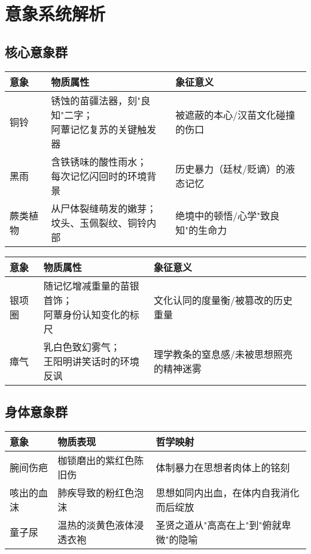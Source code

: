 \documentclass{article}
\begin{document}
	\section{意象系统解析}
	
	\subsection{核心意象群}
	
	\begin{table}[H]
		\centering
		\begin{tabular}{lll}
			\hline
			意象 & 物质属性 & 象征意义 \\ \hline
			铜铃 & \makecell[l]{锈蚀的苗疆法器，刻"良知"二字；\\阿蕈记忆复苏的关键触发器} & 被遮蔽的本心/汉苗文化碰撞的伤口   \\ 
			黑雨 & \makecell[l]{含铁锈味的酸性雨水；\\每次记忆闪回时的环境背景} & 历史暴力（廷杖/贬谪）的液态记忆   \\ 
			蕨类植物 & \makecell[l]{从尸体裂缝萌发的嫩芽；\\坟头、玉佩裂纹、铜铃内部} & 绝境中的顿悟/心学"致良知"的生命力   \\ \hline
			
		\end{tabular}
	\end{table}
	
	\begin{table}[H]
		\centering
		\begin{tabular}{lll}
			\hline
			意象 & 物质属性 & 象征意义  \\ \hline
			银项圈 & \makecell[l]{随记忆增减重量的苗银首饰；\\阿蕈身份认知变化的标尺} & 文化认同的度量衡/被篡改的历史重量   \\ 
			瘴气 & \makecell[l]{乳白色致幻雾气；\\王阳明讲笑话时的环境反讽} & 理学教条的窒息感/未被思想照亮的精神迷雾   \\ \hline
		\end{tabular}
	\end{table}
	
	\subsection{身体意象群}
	
	\begin{table}[!ht]
		\centering
		\begin{tabular}{lll}
			\hline
			意象 & 物质表现 & 哲学映射  \\ \hline
			腕间伤疤 & 枷锁磨出的紫红色陈旧伤 & 体制暴力在思想者肉体上的铭刻  \\ 
			咳出的血沫 & 肺疾导致的粉红色泡沫 & 思想如同内出血，在体内自我消化而后绽放  \\ 
			童子尿 & 温热的淡黄色液体浸透衣袍 & 圣贤之道从"高高在上"到"俯就卑微"的隐喻  \\ \hline
		\end{tabular}
	\end{table}
	
\end{document}
